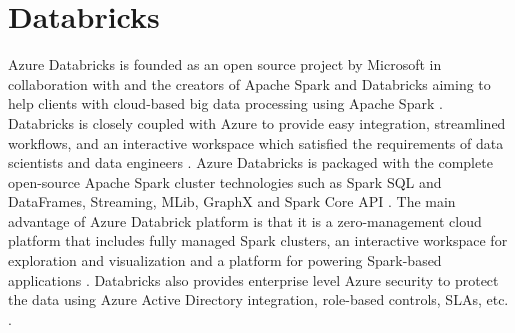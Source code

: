 \section{Databricks}

Azure Databricks is founded as an open source project by Microsoft in
collaboration with and the creators of Apache Spark and Databricks aiming to
help clients with cloud-based big data processing using Apache Spark
\cite{hid-sp18-409-www-databricks}. Databricks is closely coupled with Azure to
provide easy integration, streamlined workflows, and an interactive workspace
which satisfied the requirements of data scientists and data engineers
\cite{hid-sp18-409-www-databrick-doc}. Azure Databricks is packaged with the
complete open-source Apache Spark cluster technologies such as Spark SQL and
DataFrames, Streaming, MLib, GraphX and Spark Core API
\cite{hid-sp18-409-www-databrick-doc}. The main advantage of Azure Databrick
platform is that it is a zero-management cloud platform that includes fully
managed Spark clusters, an interactive workspace for exploration and
visualization and a platform for powering Spark-based applications
\cite{hid-sp18-409-www-databricks}. Databricks also provides enterprise level
Azure security to protect the data using Azure Active Directory integration,
role-based controls, SLAs, etc. \cite{hid-sp18-409-www-databricks}.
